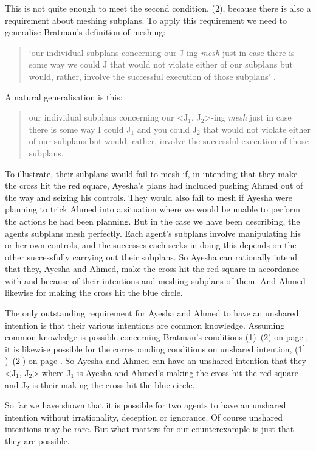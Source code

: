 \documentclass[12pt,\papersize]{extarticle}
\begin{document}
This is not quite enough to meet the second condition, (2), because there is also a requirement about meshing subplans. 
To apply this requirement we need to generalise Bratman's definition of meshing:
\begin{quote}
`our individual subplans concerning our J-ing \emph{mesh} just in case there is some way we could J that would not violate either of our subplans but would, rather, involve the successful execution of those subplans' \citep[p.\ 106]{Bratman:1993je}.
\end{quote}
A natural generalisation is this:
\begin{quote}
our individual subplans concerning our <J$_1$, J$_2$>-ing \emph{mesh} just in case there is some way I could J$_1$ and you could J$_2$ that would not violate either of our subplans but would, rather, involve the successful execution of those subplans. 
\end{quote}
%
To illustrate, 
their subplans would fail to mesh if, in intending that they make the cross hit the red square,  Ayesha's plans had included pushing Ahmed out of the way and seizing his controls. 
They would also fail to mesh if Ayesha were planning to trick Ahmed into a situation where we would be unable to perform the actions he had been planning.
But in the case we have been describing, the agents subplans mesh perfectly.
Each agent's subplans involve manipulating his or her own controls,
and the successes each seeks in doing this depends on the other successfully carrying out their subplans.
So Ayesha can rationally intend that they, Ayesha and Ahmed, make the cross hit the red square in accordance with and because of their intentions and meshing subplans of them.
And Ahmed likewise for making the cross hit the blue circle.

The only outstanding requirement for Ayesha and Ahmed to have an unshared intention is that their various intentions are common knowledge. 
Assuming common knowledge is possible concerning Bratman's conditions (1)--(2) on page \pageref{quote:bratman_account}, 
it is likewise possible for the corresponding conditions on unshared intention, (1$^\prime$)--(2$^\prime$) on page  \pageref{df:unshared_intention}.
So Ayesha and Ahmed can have an unshared intention that they <J$_1$, J$_2$> where J$_1$ is Ayesha and Ahmed's making the cross hit the red square and J$_2$ is their making the cross hit the blue circle.

So far we have shown that it is possible for two agents to have an unshared intention without irrationality, deception or ignorance.
Of course unshared intentions may be rare. 
But what matters for our counterexample is just that they are possible. 
\end{document}

